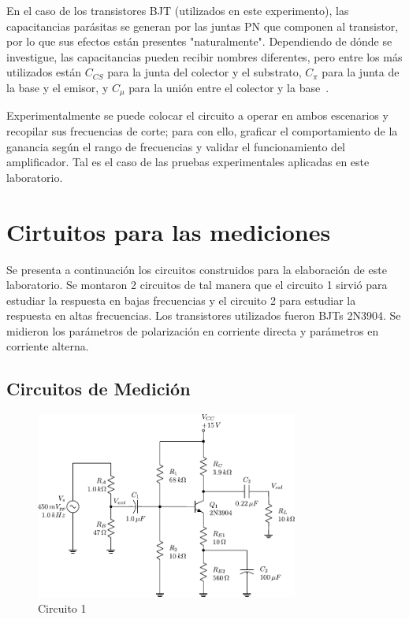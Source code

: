 \documentclass[journal]{IEEEtran}
\begin{document}
En el caso de los transistores BJT (utilizados en este experimento), las capacitancias parásitas se generan por las 
juntas PN que componen al transistor, por lo que sus efectos están presentes "naturalmente". Dependiendo de dónde se investigue, 
las capacitancias pueden recibir nombres diferentes, pero entre los más utilizados están $C_{CS}$ para la junta del
colector y el substrato, $C_{\pi}$ para la junta de la base y el emisor, y $C_{\mu}$ para la unión entre el colector y la base~\cite{Razavi}.

Experimentalmente se puede colocar el circuito a operar en ambos escenarios y recopilar sus frecuencias de corte; para con ello, graficar
el comportamiento de la ganancia según el rango de frecuencias y validar el funcionamiento del amplificador. Tal es el caso de las
pruebas experimentales aplicadas en este laboratorio. 

\section{Cirtuitos para las mediciones}
Se presenta a continuación los circuitos construidos para la elaboración de este laboratorio. 
Se montaron 2 circuitos de tal manera que el circuito 1 sirvió para estudiar la respuesta en bajas frecuencias y el circuito 2 para estudiar la respuesta en altas frecuencias. 
Los transistores utilizados fueron BJTs 2N3904.
Se midieron los parámetros de polarización en corriente directa y parámetros en corriente alterna.


\subsection{Circuitos de Medición}

\begin{figure}[H]
        \centering
        \includegraphics[width=3.4in]{CIRCUITO1.pdf}
        \caption{Circuito 1}
        \label{fig:SignalExperimental_024}
\end{figure}
\end{document}
